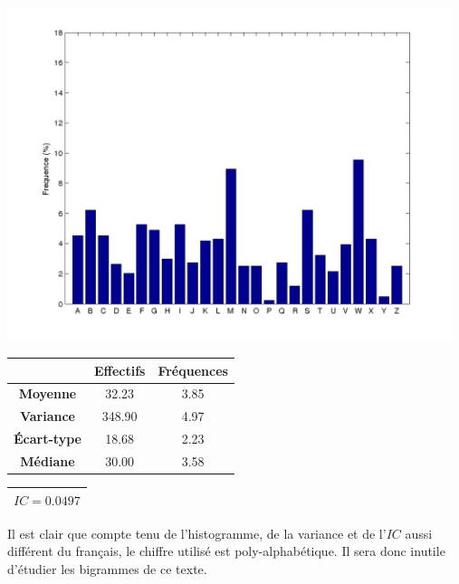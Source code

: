 \documentclass[a4paper, titlepage]{livret}
\begin{document}
\begin{minipage}[c]{.85\linewidth}\centering
\includegraphics[width=13cm]{img/resVig.png}
\label{fig3}
\end{minipage} \hfill

\begin{center}
\begin{tabular}{|c|c|c|}
	\hline
	& \textbf{Effectifs} & \textbf{Fréquences}\\
	\hline
	\textbf{Moyenne} &   32.23 &  3.85\\
	\hline
	\textbf{Variance} &  348.90 &  4.97\\
	\hline
	\textbf{Écart-type} &   18.68 &  2.23\\
	\hline
	\textbf{Médiane} &   30.00 &  3.58\\
	\hline
\end{tabular}
\label{tab15}
\end{center}

\begin{center}
\begin{tabular}{|c|}
\hline
\textbf{$IC = 0.0497$}\\
\hline
\end{tabular}
\label{tab16}
\end{center}

Il est clair que compte tenu de l'histogramme, de la variance et de l'$IC$ aussi différent du français, le chiffre utilisé est poly-alphabétique.
Il sera donc inutile d'étudier les bigrammes de ce texte.
\end{document}
